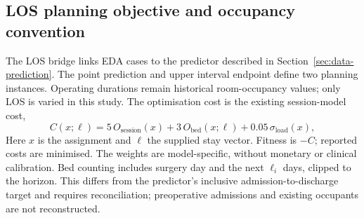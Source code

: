 \subsection{LOS planning objective and occupancy convention}

The LOS bridge links EDA cases to the predictor described in
Section~\ref{sec:data-prediction}. The point prediction and upper interval
endpoint define two planning instances. Operating durations remain historical
room-occupancy values; only LOS is varied in this study. The optimisation
cost is the existing session-model cost,
\begin{equation}
 C(x;\ell)=5\,O_{\mathrm{session}}(x)
          +3\,O_{\mathrm{bed}}(x;\ell)
          +0.05\,\sigma_{\mathrm{load}}(x),
 \label{eq:los-cost}
\end{equation}
Here $x$ is the assignment and $\ell$ the supplied stay vector. Fitness
is $-C$; reported costs are minimised. The weights are model-specific,
without monetary or clinical calibration. Bed counting includes surgery day
and the next $\ell_i$ days, clipped to the horizon. This differs from the
predictor's inclusive admission-to-discharge target and requires reconciliation;
preoperative admissions and existing occupants are not reconstructed.


